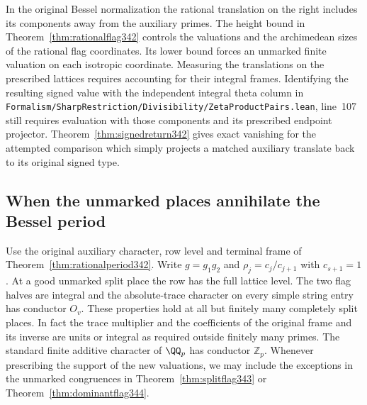 \documentclass[a4paper,11pt]{article}
\theoremstyle{definition}
\theoremstyle{remark}
\newcommand{\ZZ}{\mathbb Z}\newcommand{\ord}{\operatorname{ord}}
\newcommand{\srcloc}[2]{{\small\nolinkurl{#1.lean}}, line~#2}
\numberwithin{equation}{section}
\begin{document}
In the original Bessel normalization the rational translation on the
right includes its components away from the auxiliary primes. The
height bound in Theorem~\ref{thm:rationalflag342} controls the
valuations and the archimedean sizes of the rational flag coordinates.
Its lower bound forces an unmarked finite valuation on each isotropic
coordinate. Measuring the translations on the prescribed lattices
requires accounting for their integral frames. Identifying
the resulting signed value with the independent integral theta
column in \srcloc{Formalism/SharpRestriction/Divisibility/ZetaProductPairs}{107}
still requires evaluation with those components and its prescribed
endpoint projector. Theorem~\ref{thm:signedreturn342} gives exact
vanishing for the attempted comparison which simply projects a
matched auxiliary translate back to its original signed type.


\subsection{When the unmarked places annihilate the Bessel period}\label{sec:flagvanishing344}
Use the original auxiliary character, row level and terminal frame
of Theorem~\ref{thm:rationalperiod342}. Write $g=g_1g_2$ and
$\rho_j=c_j/c_{j+1}$ with $c_{s+1}=1$. At a good unmarked split
place the row has the full lattice level. The two flag halves are
integral and the absolute-trace character on every simple string
entry has conductor $O_v$. These properties hold at all but finitely
many completely split places. In fact the trace multiplier and the
coefficients of the original frame and its inverse are units or
integral as required outside finitely many primes. The standard
finite additive character of $\QQ_p$ has conductor $\ZZ_p$.
Whenever prescribing the support of the new valuations, we may
include the exceptions in the unmarked congruences in
Theorem~\ref{thm:splitflag343} or Theorem~\ref{thm:dominantflag344}.
\end{document}
